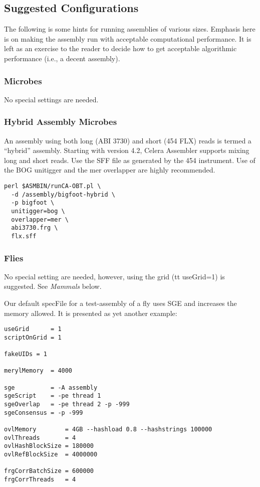 \documentclass[twoside,11pt]{article}
\begin{document}
\subsection{Suggested Configurations}

The following is some hints for running assemblies of various sizes.
Emphasis here is on making the assembly run with acceptable
computational performance.  It is left as an exercise to the reader to
decide how to get acceptable algorithmic performance (i.e., a decent
assembly).

\subsubsection{Microbes}

No special settings are needed.

\subsubsection{Hybrid Assembly Microbes}

An assembly using both long (ABI 3730) and short (454 FLX) reads is
termed a ``hybrid'' assembly.  Starting with version 4.2, Celera
Assembler supports mixing long and short reads.  Use the SFF file as
generated by the 454 instrument.  Use of the BOG unitigger and the mer
overlapper are highly recommended.

\begin{verbatim}
perl $ASMBIN/runCA-OBT.pl \
  -d /assembly/bigfoot-hybrid \
  -p bigfoot \
  unitigger=bog \
  overlapper=mer \
  abi3730.frg \
  flx.sff
\end{verbatim}

\subsubsection{Flies}

No special setting are needed, however, using the grid ({tt
useGrid=1}) is suggested.  See {\em Mammals} below.

Our default specFile for a test-assembly of a fly uses SGE and
increases the memory allowed.  It is presented as yet another example:

\begin{verbatim}
useGrid      = 1
scriptOnGrid = 1

fakeUIDs = 1

merylMemory  = 4000

sge          = -A assembly
sgeScript    = -pe thread 1
sgeOverlap   = -pe thread 2 -p -999
sgeConsensus = -p -999

ovlMemory        = 4GB --hashload 0.8 --hashstrings 100000
ovlThreads       = 4
ovlHashBlockSize = 180000
ovlRefBlockSize  = 4000000

frgCorrBatchSize = 600000
frgCorrThreads   = 4
\end{verbatim}
\end{document}
